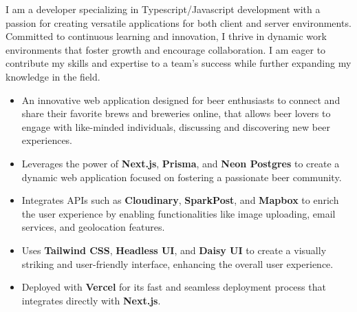 \documentclass[10pt,a4paper,withhyper]{altacv}
\begin{document}

\makecvheader
{}

\begin{paracol}{2}
  I am a developer specializing in Typescript/Javascript development with a passion for creating versatile applications for both client and server environments. Committed to continuous learning and innovation, I thrive in dynamic work environments that foster growth and encourage collaboration. I am eager to contribute my skills and expertise to a team's success while further expanding my knowledge in the field.

  \begin{itemize}
	\item An innovative web application designed for beer enthusiasts to connect and share their favorite brews and breweries online, that allows beer lovers to engage with like-minded individuals, discussing and discovering new beer experiences.
    \item Leverages the power of \textbf{Next.js}, \textbf{Prisma}, and \textbf{Neon Postgres} to create a dynamic web application focused on fostering a passionate beer community.
    \item Integrates APIs such as \textbf{Cloudinary}, \textbf{SparkPost}, and \textbf{Mapbox} to enrich the user experience by enabling functionalities like image uploading, email services, and geolocation features.
    \item Uses \textbf{Tailwind CSS}, \textbf{Headless UI}, and \textbf{Daisy UI} to create a visually striking and user-friendly interface, enhancing the overall user experience.
    \item Deployed with \textbf{Vercel} for its fast and seamless deployment process that integrates directly with \textbf{Next.js}.
  \end{itemize}

  \divider


\end{paracol}
\end{document}
